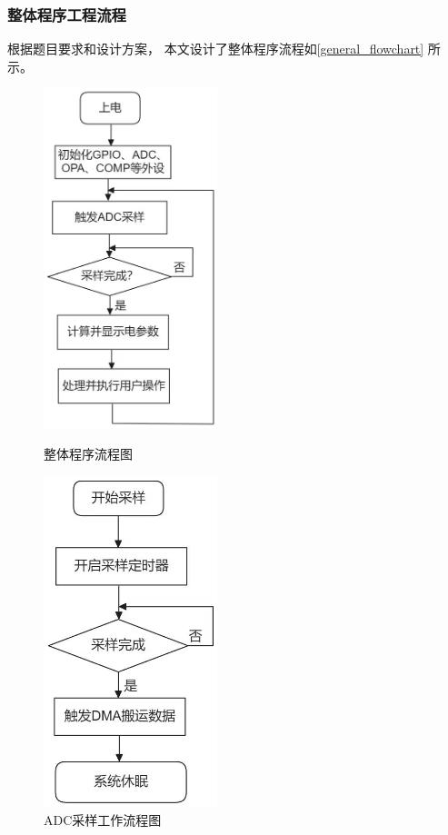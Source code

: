 \documentclass[a4paper,12pt,UTF8]{article}
\begin{document}
\subsubsection{整体程序工程流程}
根据题目要求和设计方案，
本文设计了整体程序流程如\autoref{general_flowchart} 所示。
\begin{figure}[H]
    \centering
    \begin{minipage}{0.45\textwidth}
        \centering
        \includegraphics[width=0.45\textwidth]{figures/general_flowchart.jpg}
        \caption{整体程序流程图}
        \label{general_flowchart}
    \end{minipage}
    \quad
    \begin{minipage}{0.45\textwidth}
        \centering
        \includegraphics[width=0.45\textwidth]{figures/adc_flowchart.jpg}
        \caption{ADC采样工作流程图}
        \label{adc_flowchart}
    \end{minipage}
\end{figure}
\end{document}
